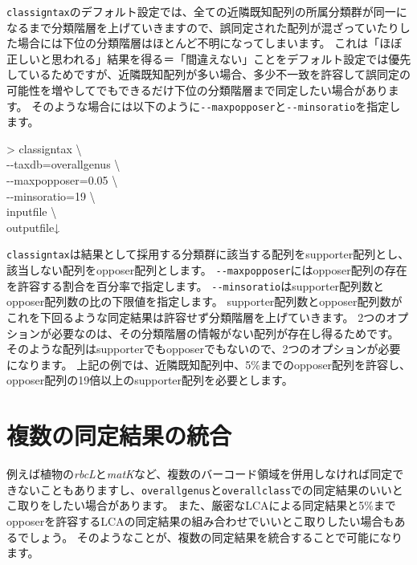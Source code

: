 \documentclass[titlepage,10pt,a4paper,english]{jsbook}
\newenvironment{cmd}{\begin{oframed}\raggedright\ttfamily\footnotesize\setlength{\baselineskip}{1.4em}}{\end{oframed}\vspace{-1em}}
\begin{document}
\texttt{classigntax}のデフォルト設定では、全ての近隣既知配列の所属分類群が同一になるまで分類階層を上げていきますので、誤同定された配列が混ざっていたりした場合には下位の分類階層はほとんど不明になってしまいます。
これは「ほぼ正しいと思われる」結果を得る＝「間違えない」ことをデフォルト設定では優先しているためですが、近隣既知配列が多い場合、多少不一致を許容して誤同定の可能性を増やしてでもできるだけ下位の分類階層まで同定したい場合があります。
そのような場合には以下のように\texttt{{-}{-}maxpopposer}と\texttt{{-}{-}minsoratio}を指定します。
\begin{cmd}
{\textgreater} classigntax {\textbackslash}\\
{-}{-}taxdb=overall{\textunderscore}genus {\textbackslash}\\
{-}{-}maxpopposer=0.05 {\textbackslash}\\
{-}{-}minsoratio=19 {\textbackslash}\\
inputfile {\textbackslash}\\
outputfile↓
\end{cmd}
\texttt{classigntax}は結果として採用する分類群に該当する配列をsupporter配列とし、該当しない配列をopposer配列とします。
\texttt{{-}{-}maxpopposer}にはopposer配列の存在を許容する割合を百分率で指定します。
\texttt{{-}{-}minsoratio}はsupporter配列数とopposer配列数の比の下限値を指定します。
supporter配列数とopposer配列数がこれを下回るような同定結果は許容せず分類階層を上げていきます。
2つのオプションが必要なのは、その分類階層の情報がない配列が存在し得るためです。
そのような配列はsupporterでもopposerでもないので、2つのオプションが必要になります。
上記の例では、近隣既知配列中、5\%までのopposer配列を許容し、opposer配列の19倍以上のsupporter配列を必要とします。

\section{複数の同定結果の統合}\label{section:mergingmultipleassignment}

例えば植物の\textit{rbcL}と\textit{matK}など、複数のバーコード領域を併用しなければ同定できないこともありますし、\texttt{overall{\textunderscore}genus}と\texttt{overall{\textunderscore}class}での同定結果のいいとこ取りをしたい場合があります。
また、厳密なLCAによる同定結果と5\%までopposerを許容するLCAの同定結果の組み合わせでいいとこ取りしたい場合もあるでしょう。
そのようなことが、複数の同定結果を統合することで可能になります。
\end{document}
